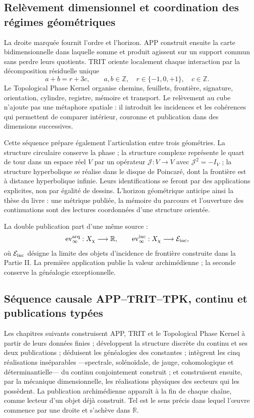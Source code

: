 \subsection*{Relèvement dimensionnel et coordination des régimes géométriques}

La droite marquée fournit l'ordre et l'horizon. APP construit ensuite
la carte bidimensionnelle dans laquelle somme et produit agissent sur un support
commun sans perdre leurs quotients. TRIT oriente localement chaque interaction par
la décomposition résiduelle unique
\[
 a+b=r+3c,
 \qquad a,b\in\mathbb Z,\quad
 r\in\{-1,0,+1\},\quad c\in\mathbb Z.
\]
Le Topological Phase Kernel organise chemins, feuillets, frontière, signature,
orientation, cylindre, registre, mémoire et transport. Le relèvement au cube
n'ajoute pas une métaphore spatiale : il introduit les incidences et les cohérences qui
permettent de comparer intérieur, couronne et publication dans des dimensions successives.

Cette séquence prépare également l'articulation entre trois géométries. La
structure circulaire conserve la phase ; la structure complexe représente le
quart de tour dans un espace réel \(V\) par un opérateur
\(\mathcal J:V\to V\) avec \(\mathcal J^2=-I_V\) ; la structure hyperbolique
se réalise dans le disque de Poincaré, dont la frontière est à distance
hyperbolique infinie. Leurs identifications se feront par des applications
explicites, non par égalité de dessins. L'horizon géométrique anticipe ainsi
la thèse du livre : une métrique publiée, la mémoire du parcours et
l'ouverture des continuations sont des lectures coordonnées d'une structure
orientée.

La double publication part d'une même source :
\[
 \operatorname{ev}^{\rm arq}_\infty:X_\chi\longrightarrow\mathbb R,
 \qquad
 \operatorname{ev}^{\rm inc}_\infty:X_\chi\longrightarrow\mathcal E_{\rm inc},
\]
où \(\mathcal E_{\rm inc}\) désigne la limite des objets d'incidence
de frontière construite dans la Partie II. La première application publie la
valeur archimédienne ; la seconde conserve la généalogie exceptionnelle.

\subsection*{Séquence causale APP–TRIT–TPK, continu et publications typées}

Les chapitres suivants construisent APP, TRIT et le Topological Phase Kernel
à partir de leurs données finies ; développent la structure discrète du continu et
ses deux publications ; déduisent les généalogies des constantes ; intègrent
les cinq réalisations inséparables —spectrale, solénoïdale, de jauge,
cohomologique et déterminantielle— du continu conjointement construit ; et construisent ensuite,
par la mécanique dimensionnelle, les réalisations physiques des secteurs qui
les possèdent. La publication
archimédienne apparaît à la fin de chaque chaîne, comme lecteur d'un objet déjà
construit. Tel est le sens précis dans lequel l'œuvre commence par une droite
et s'achève dans \(\mathbb R\).

